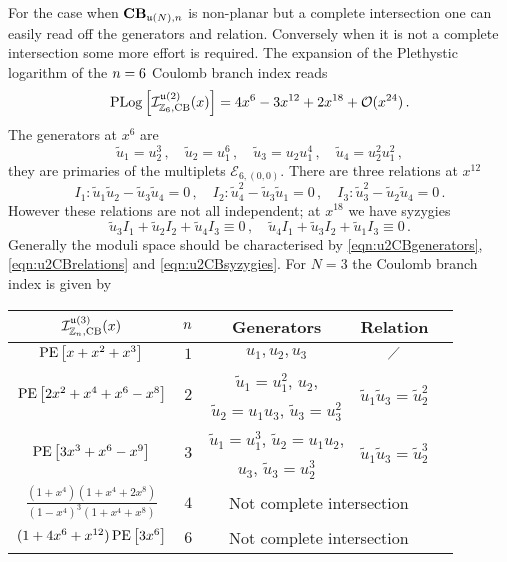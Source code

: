 \documentclass[main.tex]{subfiles}
\begin{document}
For the case when $\mathbf{CB}_{\mathfrak{u}(N),n}$ is non-planar but a complete intersection one can easily read off the generators and relation. Conversely when it is not a complete intersection some more effort is required. The expansion of the Plethystic logarithm of the $n=6$ Coulomb branch index reads
\begin{equation}\label{eqn:u2CBPlog}
\operatorname{\mathrm{PLog}}\left[\mathcal{I}^{\mathfrak{u}(2)}_{\mathbb{Z}_6,\text{CB}}(x)\right]=4 x^6 - 3 x^{12} + 2 x^{18} +\mathcal{O}(x^{24})\,.
\end{equation} 
The generators at $x^6$ are 
\begin{equation}\label{eqn:u2CBgenerators}
\widetilde{u}_1=u_2^3\,,\quad\widetilde{u}_2=u_1^6\,,\quad\widetilde{u}_3=u_2u_1^4\,,\quad\widetilde{u}_4=u_2^2u_1^2\,,
\end{equation} 
they are primaries of the multiplets $\mathcal{E}_{6,(0,0)}$. There are three relations at $x^{12}$ 
\begin{equation}\label{eqn:u2CBrelations}
I_1:\widetilde{u}_1\widetilde{u}_2-\widetilde{u}_3\widetilde{u}_4=0\,,\quad I_2:\widetilde{u}_4^2-\widetilde{u}_3\widetilde{u}_1=0\,,\quad I_3:\widetilde{u}_3^2-\widetilde{u}_2\widetilde{u}_4=0\,.
\end{equation}
However these relations are not all independent; at $x^{18}$ we have syzygies
\begin{equation}\label{eqn:u2CBsyzygies}
\widetilde{u}_3I_1+\widetilde{u}_2I_2+\widetilde{u}_4 I_3\equiv0\,,\quad \widetilde{u}_4 I_1+\widetilde{u}_3 I_2+\widetilde{u}_1 I_3\equiv0\,.
\end{equation}
Generally the moduli space should be characterised by \eqref{eqn:u2CBgenerators}, \eqref{eqn:u2CBrelations} and \eqref{eqn:u2CBsyzygies}.
For $N=3$ the Coulomb branch index is given by
\vspace{0.1cm}
\begin{center}
\begin{tabular}{|c|c|c|c|c|}
\hline
$\mathcal{I}_{\mathbb{Z}_{n},\text{CB}}^{\mathfrak{u}(3)}(x)$&${n}$&Generators&Relation\\\hline
$\operatorname{\mathrm{PE}}\left[x+x^2+x^3\right]$ & $1$ &$u_1,u_2,u_3$&$\diagup$\\\hline
\multirow{ 2}{*}{$\operatorname{\mathrm{PE}}\left[2x^2+x^4+x^6-x^8\right]$} & \multirow{ 2}{*}{$2$} & $\widetilde{u}_1=u_1^2$, $u_2$, &\multirow{ 2}{*}{$\widetilde{u}_1\widetilde{u}_3=\widetilde{u}_2^2$}\\
&&$\widetilde{u}_2=u_1u_3$, $\widetilde{u}_3=u_3^2$&\\\hline
\multirow{ 2}{*}{$\operatorname{\mathrm{PE}}\left[3x^3+x^6-x^9\right]$}&\multirow{ 2}{*}{$3$}&$\widetilde{u}_1=u_1^3$, $\widetilde{u}_2=u_1u_2$,&\multirow{ 2}{*}{$\widetilde{u}_1\widetilde{u}_3=\widetilde{u}_2^3$}\\
&& $u_3$, $\widetilde{u}_3=u_2^3$&\\\hline
$\frac{(1+x^4)(1+x^4+2x^8)}{\left(1-x^4\right)^3(1+x^4+x^8)}$&$4$&\multicolumn{2}{c|}{Not complete intersection}\\\hline
$(1+4x^6+x^{12})\operatorname{\mathrm{PE}}\left[3x^6\right]$&$6$&\multicolumn{2}{c|}{Not complete intersection}\\\hline
\end{tabular}
\end{center}
\end{document}
